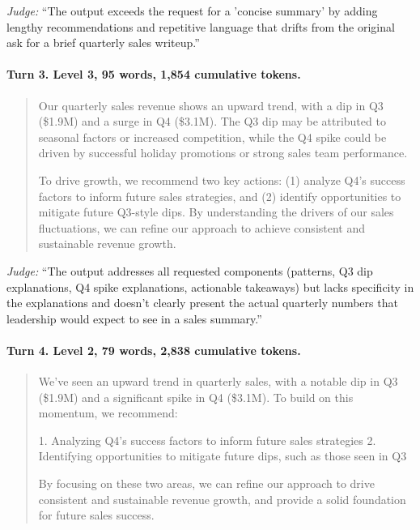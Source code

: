 \noindent\textit{Judge:} ``The output exceeds the request for a 'concise summary' by adding lengthy recommendations and repetitive language that drifts from the original ask for a brief quarterly sales writeup.''

\paragraph{Turn 3. Level 3, 95 words, 1,854 cumulative tokens.}

\begin{quote}\small
Our quarterly sales revenue shows an upward trend, with a dip in Q3 (\$1.9M) and a surge in Q4 (\$3.1M). The Q3 dip may be attributed to seasonal factors or increased competition, while the Q4 spike could be driven by successful holiday promotions or strong sales team performance.

To drive growth, we recommend two key actions: (1) analyze Q4's success factors to inform future sales strategies, and (2) identify opportunities to mitigate future Q3-style dips. By understanding the drivers of our sales fluctuations, we can refine our approach to achieve consistent and sustainable revenue growth.
\end{quote}

\noindent\textit{Judge:} ``The output addresses all requested components (patterns, Q3 dip explanations, Q4 spike explanations, actionable takeaways) but lacks specificity in the explanations and doesn't clearly present the actual quarterly numbers that leadership would expect to see in a sales summary.''

\paragraph{Turn 4. Level 2, 79 words, 2,838 cumulative tokens.}

\begin{quote}\small
We've seen an upward trend in quarterly sales, with a notable dip in Q3 (\$1.9M) and a significant spike in Q4 (\$3.1M). To build on this momentum, we recommend:

1. Analyzing Q4's success factors to inform future sales strategies
2. Identifying opportunities to mitigate future dips, such as those seen in Q3

By focusing on these two areas, we can refine our approach to drive consistent and sustainable revenue growth, and provide a solid foundation for future sales success.
\end{quote}


